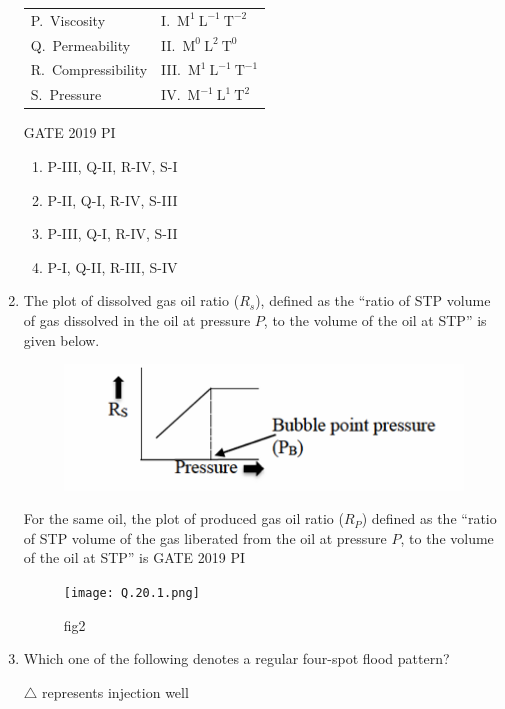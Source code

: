 \documentclass[journal,12pt,onecolumn]{IEEEtran}
\theoremstyle{remark}
\begin{document}
\begin{enumerate}
\begin{tabular}{ll}
P.\ Viscosity        & I.\ $\mathrm{M^1\ L^{-1}\ T^{-2}}$ \\
Q.\ Permeability     & II.\ $\mathrm{M^0\ L^2\ T^0}$ \\
R.\ Compressibility  & III.\ $\mathrm{M^1\ L^{-1}\ T^{-1}}$ \\
S.\ Pressure         & IV.\ $\mathrm{M^{-1}\ L^{1}\ T^{2}}$ \\
\end{tabular}

\hfill{GATE 2019 PI}

\begin{multicols}{2}
\begin{enumerate}
    \item P-III, Q-II, R-IV, S-I
    \item P-II, Q-I, R-IV, S-III
    \item P-III, Q-I, R-IV, S-II
    \item P-I, Q-II, R-III, S-IV
\end{enumerate}
\end{multicols}
\item The plot of dissolved gas oil ratio ($R_s$), defined as the ``ratio of STP volume of gas dissolved in the oil at pressure $P$, to the volume of the oil at STP'' is given below.
\begin{figure}[H]
    \centering
\includegraphics[width=0.5\linewidth]{figs/Q.20.png}
    \caption{}
    \label{fig:figs/Q.20.png}
\end{figure}
For the same oil, the plot of produced gas oil ratio ($R_P$) defined as the ``ratio of STP volume of the gas liberated from the oil at pressure $P$, to the volume of the oil at STP'' is
\hfill{GATE 2019 PI}
\begin{figure}[H]
    \centering
    \texttt{[image: Q.20.1.png]}
    \caption{fig2}
    \label{fig:Q.20.1.png}
\end{figure}
\item Which one of the following denotes a regular four-spot flood pattern?


$\triangle$ represents injection well


\end{enumerate}
\end{document}
